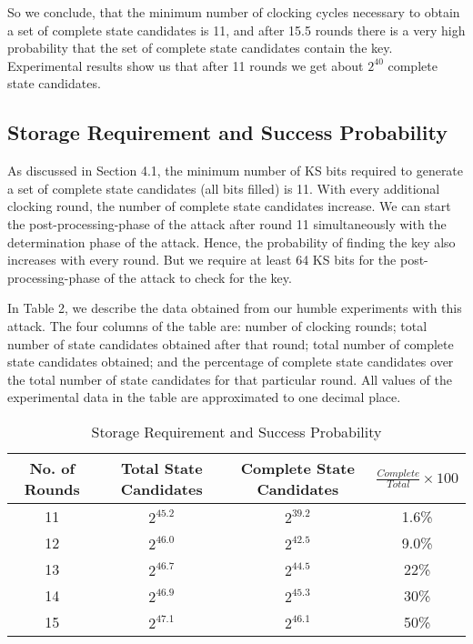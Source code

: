 \documentclass{llncs}
\begin{document}
So we conclude, that the minimum number of clocking cycles necessary to obtain a set of complete state candidates is 11, and after 15.5 rounds there is a very high probability that the set of complete state candidates contain the key. Experimental results show us that after 11 rounds we get about $2^{40}$ complete state candidates.

\subsection{Storage Requirement and Success Probability} 
As discussed in Section 4.1, the minimum number of KS bits required to generate a set of complete state candidates (all bits filled) is 11. With every additional clocking round, the number of complete state candidates increase. We can start the post-processing-phase of the attack after round 11 simultaneously with the determination phase of the attack. Hence, the probability of finding the key also increases with every round. But we require at least 64 KS bits for the post-processing-phase of the attack to check for the key.

In Table 2, we describe the data obtained from our humble experiments with this attack. The four columns of the table are: number of clocking rounds; total number of state candidates obtained after that round; total number of complete state candidates obtained; and the percentage of complete state candidates over the total number of state candidates for that particular round. All values of the experimental data in the table are approximated to one decimal place.
\begin{table}[!htb]
\caption{Storage Requirement and Success Probability} \centering      \begin{tabular}{c c c c}  \hline\hline                        No. of Rounds & Total State Candidates & Complete State Candidates & $\frac{Complete}{Total}\times 100$ \\ [0.5ex] \hline                 11 & $2^{45.2}$ & $2^{39.2}$ & 1.6\% \\   12 & $2^{46.0}$ & $2^{42.5}$ & 9.0\% \\ 
13 & $2^{46.7}$ & $2^{44.5}$ & 22\%  \\ 
14 & $2^{46.9}$ & $2^{45.3}$ & 30\% \\ 
15 & $2^{47.1}$ & $2^{46.1}$ & 50\% \\ [1ex]       \hline     \end{tabular} 
\label{table}  \end{table}
\end{document}
